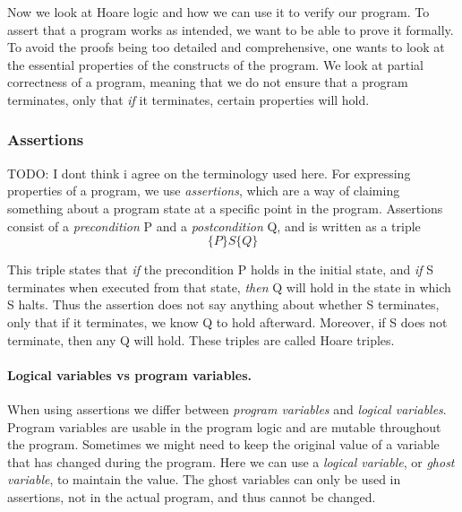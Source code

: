 Now we look at Hoare logic and how we can use it to verify our program.
To assert that a program works as intended, we want to be able to prove it formally. To avoid the proofs being too detailed and comprehensive, one wants to look at the essential properties of the constructs of the program. We look at partial correctness of a program, meaning that we do not ensure that a program terminates, only that \textit{if} it terminates, certain properties will hold.

\subsubsection{Assertions}
TODO: I dont think i agree on the terminology used here.
For expressing properties of a program, we use \textit{assertions}, which are a way of claiming something about a program state at a specific point in the program.
Assertions consist of a \textit{precondition} P and a \textit{postcondition} Q, and is written as a triple
$$ \{ P \} S \{ Q \} $$

This triple states that \textit{if} the precondition P holds in the initial state, and \textit{if} S terminates when executed from that state, \textit{then} Q will hold in the state in which S halts.
Thus the assertion does not say anything about whether S terminates, only that if it terminates, we know Q to hold afterward. Moreover, if S does not terminate, then any Q will hold. These triples are called Hoare triples.

\paragraph{Logical variables vs program variables.}
When using assertions we differ between \textit{program variables} and \textit{logical variables}.
Program variables are usable in the program logic and are mutable throughout the program.
Sometimes we might need to keep the original value of a variable that has changed during the program. Here we can use a \textit{logical variable}, or \textit{ghost variable}, to maintain the value. The ghost variables can only be used in assertions, not in the actual program, and thus cannot be changed.

